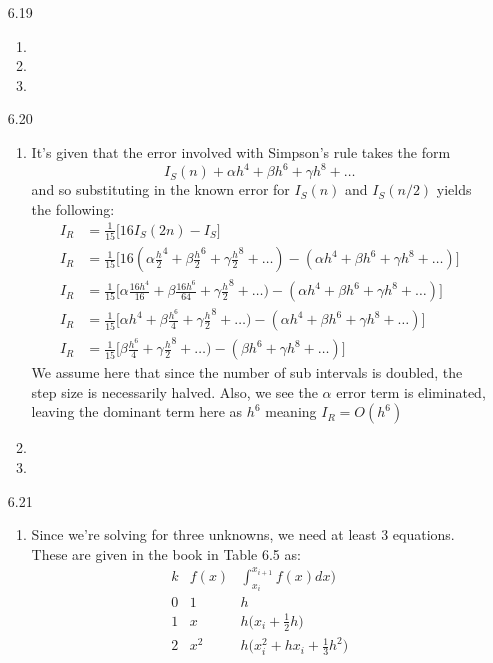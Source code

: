 \documentclass[11pt,a4paper]{article}
\begin{document}
\begin{itemize}
			\item[6.19]
				\begin{enumerate} [label={\alph*)}]
					\item 
					\item 
					\item
				\end{enumerate}
				
			\item[6.20]
				\begin{enumerate} [label={\alph*)}]
					\item It's given that the error involved with Simpson's rule takes the form
					$$I_S(n) + \alpha h^4 + \beta h^6 + \gamma h^8 + \dots$$
					and so substituting in the known error for $I_S(n)$ and $I_S(n/2)$ yields the following:
					\begin{align*}
						I_R &= \frac{1}{15}\Big[ 16I_S(2n)-I_S\Big] \\
						I_R &= \frac{1}{15}\Big[ 16(\alpha\frac{h}{2}^4 + \beta\frac{h}{2}^6 + \gamma\frac{h}{2}^8+\dots) - (\alpha h^4 + \beta h^6 + \gamma h^8+\dots)\Big] \\
						I_R &= \frac{1}{15}\Big[ \alpha\frac{16h^4}{16} + \beta\frac{16h^6}{64} + \gamma\frac{h}{2}^8+\dots) - (\alpha h^4 + \beta h^6 + \gamma h^8+\dots)\Big] \\
						I_R &= \frac{1}{15}\Big[ \alpha h^4 + \beta\frac{h^6}{4} + \gamma\frac{h}{2}^8+\dots) - (\alpha h^4 + \beta h^6 + \gamma h^8+\dots)\Big] \\ 
						I_R &= \frac{1}{15}\Big[ \beta\frac{h^6}{4} + \gamma\frac{h}{2}^8+\dots) - (\beta h^6 + \gamma h^8+\dots)\Big]
					\end{align*}
					We assume here that since the number of sub intervals is doubled, the step size is necessarily halved. Also, we see the $\alpha$ error term is eliminated, leaving the dominant term here as $h^6$ meaning $I_R = O(h^6)$
					\item 
					\item
				\end{enumerate}
				
			\item[6.21]
				\begin{enumerate} [label={\alph*)}]
					\item Since we're solving for three unknowns, we need at least 3 equations. These are given in the book in Table 6.5 as:
					$$\begin{array}{|c|c|c|}
						k & f(x) & \displaystyle\int_{x_i}^{x_{i+1}} f(x)dx) \\ \hline
						0 & 1 & h \\
						1 & x & h\Big(x_i + \frac{1}{2}h\Big) \\
						2 & x^2 & h\Big(x_i^2 + hx_i + \frac{1}{3}h^2 \Big)
					\end{array}$$
					

\end{enumerate}
\end{itemize}
\end{document}
